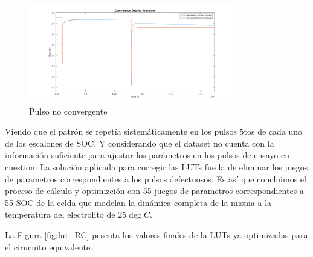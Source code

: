 \documentclass[10pt, a4paper]{article}
\begin{document}
\begin{figure}[h!]
	\begin{center}
        \includegraphics[width=0.8\textwidth]{Vterm_exp_vs_sim_pulse_5_error.png}
		\caption{Pulso no convergente}
		\label{fig:exp_vs_sim_5_error}
	\end{center}
\end{figure}

Viendo que el patrón se repetía sistemáticamente en los pulsos 5tos de cada uno
de los escalones de \acrshort{SOC}. Y considerando que el dataset no cuenta con
la información suficiente para ajustar los parámetros en los pulsos de ensayo en
cuestion. La solución aplicada para corregir las \acrshort{LUT}s fue la de
eliminar los juegos de parametros correspondientes a los pulsos defectuosos. Es
así que concluimos el proceso de cálculo y optimizción con 55 juegos de
parametros correspondientes a 55 \acrshort{SOC} de la celda que modelan la
dinámica completa de la misma a la temperatura del electrolito de $25\deg C$.

La Figura \ref{fig:lut_RC} pesenta los valores finales de la \acrshort{LUT}s ya
optimizadas para el cirucuito equivalente.
\end{document}
